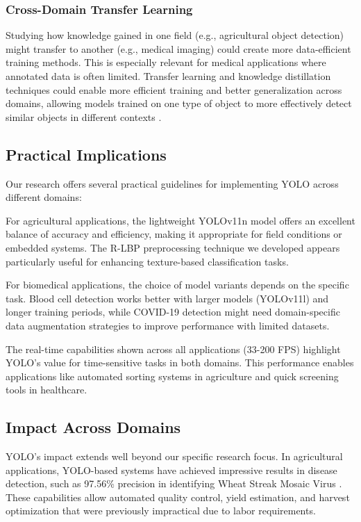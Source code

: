 \subsubsection{Cross-Domain Transfer Learning}
Studying how knowledge gained in one field (e.g., agricultural object detection) might transfer to another (e.g., medical imaging) could create more data-efficient training methods. This is especially relevant for medical applications where annotated data is often limited. Transfer learning and knowledge distillation techniques could enable more efficient training and better generalization across domains, allowing models trained on one type of object to more effectively detect similar objects in different contexts \citep{Mhalla2024}.

\subsection{Practical Implications}

Our research offers several practical guidelines for implementing YOLO across different domains:

For agricultural applications, the lightweight YOLOv11n model offers an excellent balance of accuracy and efficiency, making it appropriate for field conditions or embedded systems. The R-LBP preprocessing technique we developed appears particularly useful for enhancing texture-based classification tasks.

For biomedical applications, the choice of model variants depends on the specific task. Blood cell detection works better with larger models (YOLOv11l) and longer training periods, while COVID-19 detection might need domain-specific data augmentation strategies to improve performance with limited datasets.

The real-time capabilities shown across all applications (33-200 FPS) highlight YOLO's value for time-sensitive tasks in both domains. This performance enables applications like automated sorting systems in agriculture and quick screening tools in healthcare.

\subsection{Impact Across Domains}

YOLO's impact extends well beyond our specific research focus. In agricultural applications, YOLO-based systems have achieved impressive results in disease detection, such as 97.56\% precision in identifying Wheat Streak Mosaic Virus \citep{Akbar2024}. These capabilities allow automated quality control, yield estimation, and harvest optimization that were previously impractical due to labor requirements.

